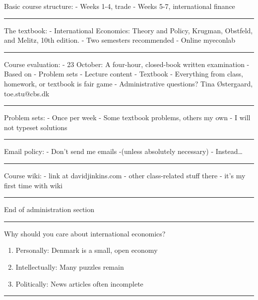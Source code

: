 Basic course structure: - Weeks 1-4, trade - Weeks 5-7, international
finance

\begin{center}\rule{3in}{0.4pt}\end{center}

The textbook: - International Economics: Theory and Policy, Krugman,
Obstfeld, and Melitz, 10th edition. - Two semesters recommended - Online
myeconlab

\begin{center}\rule{3in}{0.4pt}\end{center}

Course evaluation: - 23 October: A four-hour, closed-book written
examination - Based on - Problem sets - Lecture content - Textbook -
Everything from class, homework, or textbook is fair game -
Administrative questions? Tina Østergaard, toe.stu@cbs.dk

\begin{center}\rule{3in}{0.4pt}\end{center}

Problem sets: - Once per week - Some textbook problems, others my own -
I will not typeset solutions

\begin{center}\rule{3in}{0.4pt}\end{center}

Email policy: - Don't send me emails -(unless absolutely necessary) -
Instead\ldots

\begin{center}\rule{3in}{0.4pt}\end{center}

Course wiki: - link at davidjinkins.com - other class-related stuff
there - it's my first time with wiki

\begin{center}\rule{3in}{0.4pt}\end{center}

End of administration section

\begin{center}\rule{3in}{0.4pt}\end{center}

Why should you care about international economics?

\begin{enumerate}
\def\labelenumi{\arabic{enumi}.}
\itemsep1pt\parskip0pt
\item
  Personally: Denmark is a small, open economy
\item
  Intellectually: Many puzzles remain
\item
  Politically: News articles often incomplete
\end{enumerate}

\begin{center}\rule{3in}{0.4pt}\end{center}
